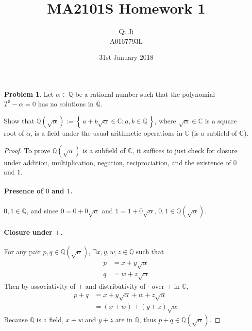 \documentclass{article}
\author{Qi Ji\\\small A0167793L}
\title{MA2101S Homework 1}
\date{31st January 2018}
\theoremstyle{definition}
\newtheorem{problem}{Problem}
\numberwithin{equation}{problem}
\newcommand{\Q}{\mathbb{Q}}
\newcommand{\C}{\mathbb{C}}
\newcommand{\set}[1]{\left\{\,#1\,\right\}}
\begin{document}
\maketitle

\begin{problem}
    Let $\alpha \in \Q$ be a rational number such that the polynomial
    $T^2 - \alpha = 0$ has no solutions in $\Q$.

    Show that $\Q(\sqrt{\alpha}) := \set{ a + b\sqrt{\alpha} \in \C: a,b\in \Q}$,
    where $\sqrt{\alpha}\in\C$ is a square root of $\alpha$,
    is a field under the usual arithmetic operations in $\C$ (is a subfield of $\C$).
\end{problem}
\begin{proof}
    To prove $\Q(\sqrt{\alpha})$ is a subfield of $\C$,
    it suffices to just check for closure under addition, multiplication, negation, reciprociation,
    and the existence of $0$ and $1$.

    \paragraph{Presence of $0$ and $1$.}
    $0,1\in \Q$, and since $0 = 0 + 0\sqrt{\alpha}$ and $1 = 1 + 0\sqrt{\alpha}$, $0,1\in \Q(\sqrt{\alpha})$.

    \paragraph{Closure under $+$.} For any pair $p,q \in \Q(\sqrt{\alpha})$,
    $\exists x, y, w, z\in \Q$ such that
    \begin{align*}
        p &= x + y\sqrt{\alpha}  \\
        q &= w + z\sqrt{\alpha}
    \end{align*}
    Then by associativity of $+$ and distributivity of $\cdot$ over $+$ in $\C$,
    \begin{align*}
        p + q &= x + y\sqrt{\alpha} + w + z\sqrt{\alpha}    \\
        &= (x + w) + (y + z)\sqrt{\alpha}
    \end{align*}
    Because $\Q$ is a field, $x + w$ and $y + z$ are in $\Q$, thus $p+q\in \Q(\sqrt{\alpha})$.


\end{proof}
\end{document}
